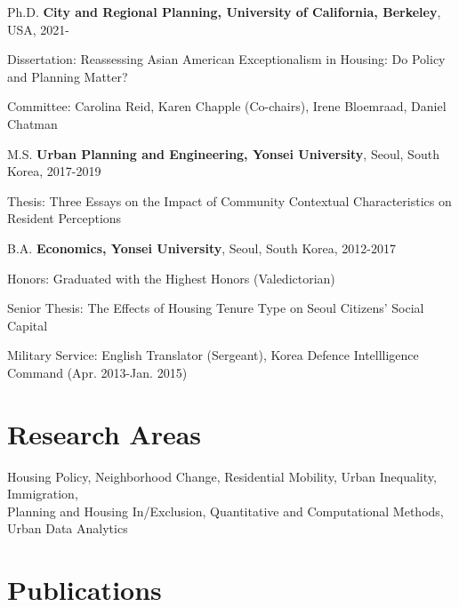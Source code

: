 \documentclass[12pt,letterpaper]{report}
\newcommand{\listitemspace}{0.4em}
\renewenvironment{itemize}
{\begin{list}{}{\setlength{\leftmargin}{0.5em}
                \setlength{\parskip}{0em}
                \setlength{\itemsep}{\listitemspace}
                \setlength{\parsep}{\listitemspace}}}
{\end{list}}
\begin{document}
    \begin{tablist}
      \item[Ph.D.] \tab{}\textbf{City and Regional Planning, University of California, Berkeley}, USA, 2021-
      \begin{itemize}
        \item Dissertation: Reassessing Asian American Exceptionalism in Housing: Do Policy and Planning Matter?
        \vspace{-0.6em}
        \item Committee: Carolina Reid, Karen Chapple (Co-chairs), Irene Bloemraad, Daniel Chatman
    \end{itemize}
      \item[M.S.] \tab{}\textbf{Urban Planning and Engineering, Yonsei University}, Seoul, South Korea, 2017-2019
      \begin{itemize}
        \item Thesis: Three Essays on the Impact of Community Contextual Characteristics on Resident Perceptions
    \end{itemize}
      \item[B.A.] \tab{}\textbf{Economics, Yonsei University}, Seoul, South Korea, 2012-2017
      \begin{itemize}
        \item Honors: Graduated with the Highest Honors (Valedictorian)
        \vspace{-0.6em}
        \item Senior Thesis: The Effects of Housing Tenure Type on Seoul Citizens' Social Capital
        \vspace{-0.6em}
        \item Military Service: English Translator (Sergeant), Korea Defence Intellligence Command (Apr. 2013-Jan. 2015)
    \end{itemize}
    \end{tablist}
    
    \section*{Research Areas}
      Housing Policy, Neighborhood Change, Residential Mobility, Urban Inequality, Immigration,\\
      Planning and Housing In/Exclusion, Quantitative and Computational Methods, Urban Data Analytics
  
    \section*{Publications}
\end{document}
